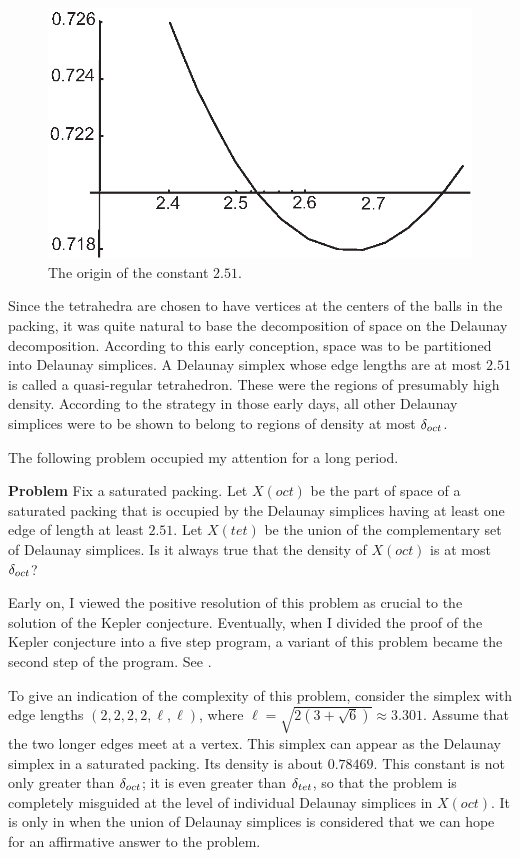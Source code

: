 \begin{figure}[htb]
  \centering
  \includegraphics{PS/t51.eps}
  \caption{The origin of the constant $2.51$.}
  \label{fig:t51}
\end{figure}

Since the tetrahedra are chosen to have vertices at the centers of
the balls in the packing, it was quite natural to base the
decomposition of space on the Delaunay decomposition. According to
this early conception, space was to be partitioned into Delaunay
simplices.  A Delaunay simplex whose edge lengths are at most
$2.51$ is called a quasi-regular tetrahedron.  These were the
regions of presumably high density.  According to the strategy in
those early days, all other Delaunay simplices were to be shown to
belong to regions of density at most $\delta_{oct}$.

The following problem occupied my attention for a long period.


\smallskip\noindent
{\bf Problem} Fix a saturated packing. Let $X(oct)$ be the part of
space of a saturated packing that is occupied by the Delaunay
simplices having at least one edge of length at least $2.51$.  Let
$X(tet)$ be the union of the complementary set of Delaunay
simplices.  Is it always true that the density of $X(oct)$ is at
most $\delta_{oct}$?

Early on, I viewed the positive resolution of this problem as
crucial to the solution of the Kepler conjecture.  Eventually, when
I divided the proof of the Kepler conjecture into a five step
program, a variant of this problem became the second step of the
program. See \cite{Hal97B}.

To give an indication of the complexity of this problem, consider
the simplex with edge lengths $(2,2,2,2,\ell,\ell)$, where $\ell =
\sqrt{2 (3 + \sqrt6)}\approx 3.301$.  Assume that the two longer
edges meet at a vertex.  This simplex can appear as the Delaunay
simplex in a saturated packing.  Its density is about $0.78469$.
This constant is not only greater than $\delta_{oct}$; it is even greater
than $\delta_{tet}$, so that the problem is completely misguided at the
level of individual Delaunay simplices in $X(oct)$.  It is only in
when the union of Delaunay simplices is considered that we can
hope for an affirmative answer to the problem.

